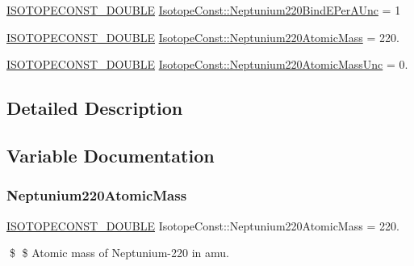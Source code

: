 \begin{DoxyCompactItemize}
\mbox{\hyperlink{group___isotope_const-_macros_ga8f45a7272ce02c0b4c65c44636ed719a}{I\+S\+O\+T\+O\+P\+E\+C\+O\+N\+S\+T\+\_\+\+D\+O\+U\+B\+LE}} \mbox{\hyperlink{group___isotope_const-_neptunium-_np220_gab3c6639e42e31fb4978be36e629df24a}{Isotope\+Const\+::\+Neptunium220\+Bind\+E\+Per\+A\+Unc}} = 1
\item 
\mbox{\hyperlink{group___isotope_const-_macros_ga8f45a7272ce02c0b4c65c44636ed719a}{I\+S\+O\+T\+O\+P\+E\+C\+O\+N\+S\+T\+\_\+\+D\+O\+U\+B\+LE}} \mbox{\hyperlink{group___isotope_const-_neptunium-_np220_ga25f4e0386bc912f7d328e98c4fdd2479}{Isotope\+Const\+::\+Neptunium220\+Atomic\+Mass}} = 220.
\item 
\mbox{\hyperlink{group___isotope_const-_macros_ga8f45a7272ce02c0b4c65c44636ed719a}{I\+S\+O\+T\+O\+P\+E\+C\+O\+N\+S\+T\+\_\+\+D\+O\+U\+B\+LE}} \mbox{\hyperlink{group___isotope_const-_neptunium-_np220_ga8e599d52673c44c9a14962ba8c794506}{Isotope\+Const\+::\+Neptunium220\+Atomic\+Mass\+Unc}} = 0.
\end{DoxyCompactItemize}


\subsection{Detailed Description}


\subsection{Variable Documentation}
\mbox{\label{group___isotope_const-_neptunium-_np220_ga25f4e0386bc912f7d328e98c4fdd2479}} 
\subsubsection{\texorpdfstring{Neptunium220\+Atomic\+Mass}{Neptunium220AtomicMass}}
{\footnotesize\ttfamily \mbox{\hyperlink{group___isotope_const-_macros_ga8f45a7272ce02c0b4c65c44636ed719a}{I\+S\+O\+T\+O\+P\+E\+C\+O\+N\+S\+T\+\_\+\+D\+O\+U\+B\+LE}} Isotope\+Const\+::\+Neptunium220\+Atomic\+Mass = 220.}

\$ \$ Atomic mass of Neptunium-\/220 in amu. \mbox{\label{group___isotope_const-_neptunium-_np220_ga8e599d52673c44c9a14962ba8c794506}} 
